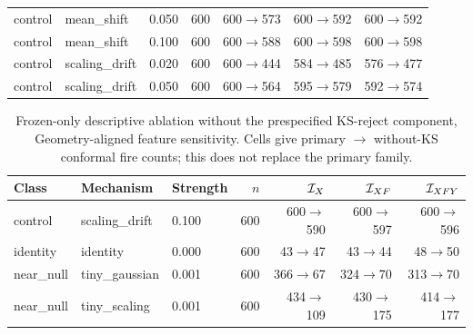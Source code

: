 \begin{table}[!t]
\begin{tabular}{@{}lllrrrr@{}}
control & mean\_shift & 0.050 & 600 & 600$\rightarrow$573 & 600$\rightarrow$592 & 600$\rightarrow$592 \\
control & mean\_shift & 0.100 & 600 & 600$\rightarrow$588 & 600$\rightarrow$598 & 600$\rightarrow$598 \\
control & scaling\_drift & 0.020 & 600 & 600$\rightarrow$444 & 584$\rightarrow$485 & 576$\rightarrow$477 \\
control & scaling\_drift & 0.050 & 600 & 600$\rightarrow$564 & 595$\rightarrow$579 & 592$\rightarrow$574 \\
\bottomrule
\end{tabular}
\end{table}

\begin{table}[!t]
\caption{Frozen-only descriptive ablation without the prespecified KS-reject component, Geometry-aligned feature sensitivity. Cells give primary $\rightarrow$ without-KS conformal fire counts; this does not replace the primary family.}
\label{tab:v137-without-ks-3}
\centering\footnotesize\renewcommand{\arraystretch}{0.90}\setlength{\tabcolsep}{4pt}
\begin{tabular}{@{}lllrrrr@{}}
\toprule
Class & Mechanism & Strength & $n$ & $\mathcal I_X$ & $\mathcal I_{XF}$ & $\mathcal I_{XFY}$ \\
\midrule
control & scaling\_drift & 0.100 & 600 & 600$\rightarrow$590 & 600$\rightarrow$597 & 600$\rightarrow$596 \\
identity & identity & 0.000 & 600 & 43$\rightarrow$47 & 43$\rightarrow$44 & 48$\rightarrow$50 \\
near\_null & tiny\_gaussian & 0.001 & 600 & 366$\rightarrow$67 & 324$\rightarrow$70 & 313$\rightarrow$70 \\
near\_null & tiny\_scaling & 0.001 & 600 & 434$\rightarrow$109 & 430$\rightarrow$175 & 414$\rightarrow$177 \\
\bottomrule
\end{tabular}
\end{table}

